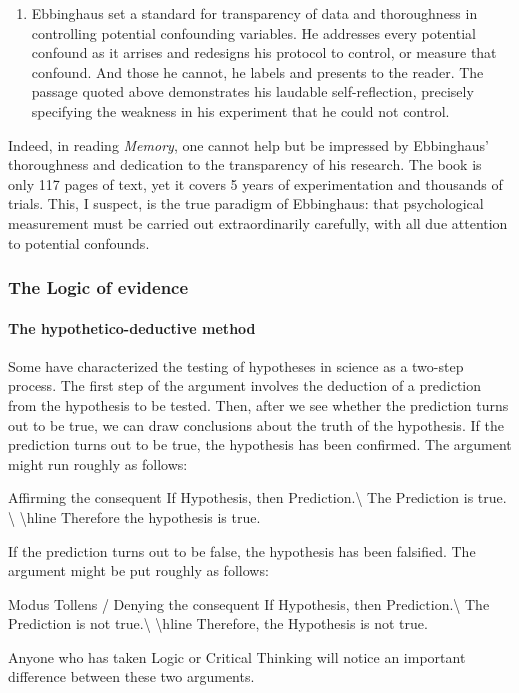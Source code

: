 \begin{refsection}
\begin{enumerate}
\item Ebbinghaus set a standard for transparency of data and thoroughness in controlling potential confounding variables. He addresses every potential confound as it arrises and redesigns his protocol to control, or measure that confound. And those he cannot, he labels and presents to the reader. The passage quoted above demonstrates his laudable self-reflection, precisely specifying the weakness in his experiment that he could not control.

\end{enumerate}

Indeed, in reading \emph{Memory}, one cannot help but be impressed by Ebbinghaus' thoroughness and dedication to the transparency of his research. The book is only 117 pages of text, yet it covers 5 years of experimentation and thousands of trials. This, I suspect, is the true paradigm of Ebbinghaus: that psychological measurement must be carried out extraordinarily carefully, with all due attention to potential confounds.

\subsubsection{The Logic of evidence}
\label{thelogicofevidence}

\paragraph{The hypothetico-deductive method}
\label{thehypothetico-deductivemethod}

Some have characterized the testing of hypotheses in science as a two-step process. The first step of the argument involves the deduction of a prediction from the hypothesis to be tested. Then, after we see whether the prediction turns out to be true, we can draw conclusions about the truth of the hypothesis. If the prediction turns out to be true, the hypothesis has been confirmed. The argument might run roughly as follows:
\begin{apatextbox}{Affirming the consequent}
If Hypothesis, then Prediction.\textbackslash{} The Prediction is true. \textbackslash{} \textbackslash{}hline Therefore the hypothesis is true.\end{apatextbox}
If the prediction turns out to be false, the hypothesis has been falsified. The argument might be put roughly as follows:
\begin{apatextbox}{Modus Tollens / Denying the consequent} 
If Hypothesis, then Prediction.\textbackslash{} The Prediction is not true.\textbackslash{} \textbackslash{}hline Therefore, the Hypothesis is not true.\end{apatextbox}
Anyone who has taken Logic or Critical Thinking will notice an important difference between these two arguments. 


\end{refsection}
